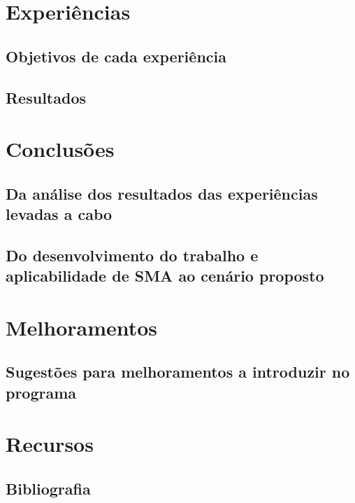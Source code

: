 \documentclass[12pt]{report}
\begin{document}
\chapter{Experiências}


\section{Objetivos de cada experiência}

\section{Resultados}

\chapter{Conclusões}

\section{Da análise dos resultados das experiências levadas a cabo}

\section{Do desenvolvimento do trabalho e aplicabilidade de SMA ao cenário proposto}

\chapter{Melhoramentos}


\section{Sugestões para melhoramentos a introduzir no programa}

\chapter{Recursos}

\section{Bibliografia}
\end{document}
